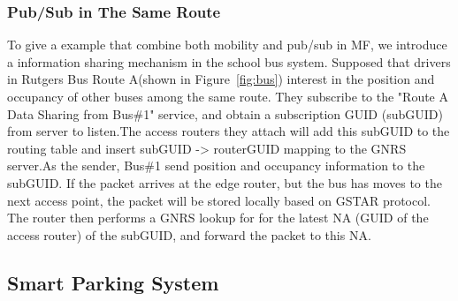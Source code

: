 \subsubsection{Pub/Sub in The Same Route}
To give a example that combine both mobility and pub/sub in MF, we introduce a information sharing mechanism in the school bus system.  Supposed that drivers in Rutgers Bus Route A(shown in Figure~\ref{fig:bus}) interest in the position and occupancy of other buses among the same route. They subscribe to the "Route A Data Sharing from Bus\#1" service, and obtain a subscription GUID (subGUID) from server to listen.The access routers they attach will add this subGUID to the routing table and insert subGUID -> routerGUID mapping to the GNRS server.As the sender, Bus\#1 send position and occupancy information to the subGUID. If the packet arrives at the edge router, but the bus has moves to the next access point, the packet will be stored locally based on GSTAR protocol. The router then performs a GNRS lookup for for the latest NA (GUID of the access router) of the subGUID, and forward the packet to this NA.      
 
\subsection{Smart Parking System}